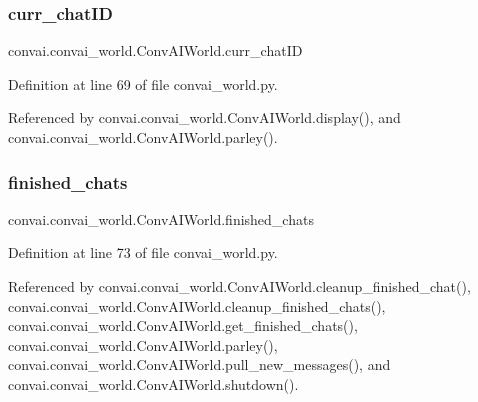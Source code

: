 \subsubsection{\texorpdfstring{curr\+\_\+chat\+ID}{curr\_chatID}}
{\footnotesize\ttfamily convai.\+convai\+\_\+world.\+Conv\+A\+I\+World.\+curr\+\_\+chat\+ID}



Definition at line 69 of file convai\+\_\+world.\+py.



Referenced by convai.\+convai\+\_\+world.\+Conv\+A\+I\+World.\+display(), and convai.\+convai\+\_\+world.\+Conv\+A\+I\+World.\+parley().

\mbox{\label{classconvai_1_1convai__world_1_1ConvAIWorld_acfb760dc6321d52756599e95536a7c60}} 
\subsubsection{\texorpdfstring{finished\+\_\+chats}{finished\_chats}}
{\footnotesize\ttfamily convai.\+convai\+\_\+world.\+Conv\+A\+I\+World.\+finished\+\_\+chats}



Definition at line 73 of file convai\+\_\+world.\+py.



Referenced by convai.\+convai\+\_\+world.\+Conv\+A\+I\+World.\+cleanup\+\_\+finished\+\_\+chat(), convai.\+convai\+\_\+world.\+Conv\+A\+I\+World.\+cleanup\+\_\+finished\+\_\+chats(), convai.\+convai\+\_\+world.\+Conv\+A\+I\+World.\+get\+\_\+finished\+\_\+chats(), convai.\+convai\+\_\+world.\+Conv\+A\+I\+World.\+parley(), convai.\+convai\+\_\+world.\+Conv\+A\+I\+World.\+pull\+\_\+new\+\_\+messages(), and convai.\+convai\+\_\+world.\+Conv\+A\+I\+World.\+shutdown().

\mbox{\label{classconvai_1_1convai__world_1_1ConvAIWorld_a49433da97f94491714d90100c86898c9}} 
